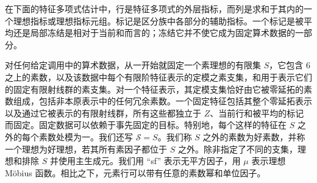 在下面的特征多项式估计中，行是特征多项式的外层指标，而列是求和于其内的一个理想指标或理想指标元组。标记是区分族中各部分的辅助指标。一个标记是被平均还是局部冻结是相对于当前和而言的；冻结它并不使它成为固定算术数据的一部分。

对任何给定调用中的算术数据，从一开始就固定一个素理想的有限集 $S$，它包含 $6$ 之上的素数，以及该数据中每个有限阶特征表示的定模之素支集，和用于表示它们的固定有限射线群的素支集。对一个特征表示，其定模支集恰好由它被零延拓的素数组成，包括非本原表示中的任何冗余素数。一个固定特征包括其整个零延拓表示以及通过它被表示的有限射线群，所有这些都独立于 $Z$、当前行和被平均的标记而固定。固定数据可以依赖于事先固定的目标。特别地，每个这样的特征在 $S$ 之外的每个素数处模为一。我们还写 $\mathcal S=S$。我们称 $S$ 之外的素数为好素数，并称一个理想为好理想，若其所有素因子都位于 $S$ 之外。除非指定了不同的支集，理想和排除 $S$ 并使用主生成元。我们用 “sf” 表示无平方因子，用 $\mu$ 表示理想 M\"obius 函数。相比之下，元素行可以带有任意的素数幂和单位因子。
